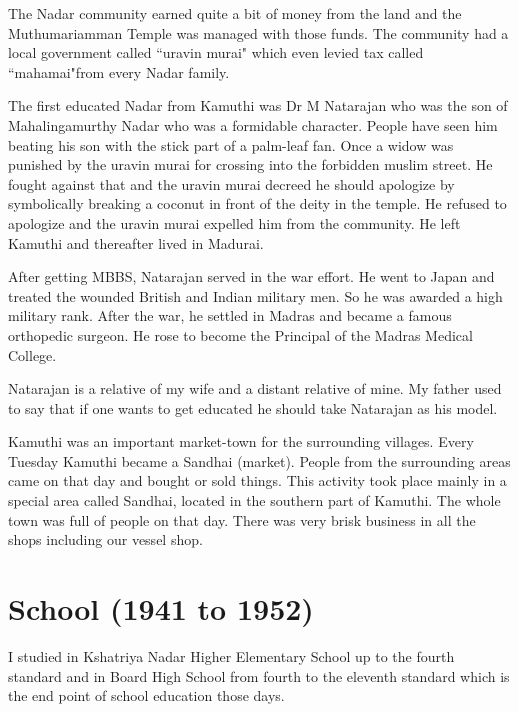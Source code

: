 The Nadar community earned quite a bit of money from the land and the 
Muthumariamman Temple was managed with those funds. The community had a 
local government called ``uravin murai" which even levied tax called 
``mahamai"from every Nadar family.

The first educated Nadar from Kamuthi was Dr M Natarajan who was the son 
of Mahalingamurthy Nadar who was a formidable character. People have 
seen him beating his son with the stick part of a palm-leaf fan. Once a 
widow was punished by the uravin murai for crossing into the forbidden 
muslim street. He fought against that and the uravin murai decreed he 
should apologize by symbolically breaking a coconut in front of the 
deity in the temple. He refused to apologize and the uravin murai 
expelled him from the community. He left Kamuthi and thereafter lived in 
Madurai.

After getting MBBS, Natarajan served in the war effort. He went to Japan 
and treated the wounded British and Indian mili\-tary men. So he was 
awarded a high military rank. After the war, he settled in Madras and 
became a famous orthopedic surgeon. He rose to become the Principal of 
the Madras Medical College.

Natarajan is a relative of my wife and a distant relative of mine. My 
father used to say that if one wants to get educated he should take 
Natarajan as his model.

Kamuthi was an important market-town for the surrounding villages. Every 
Tuesday Kamuthi became a Sandhai (market). People from the surrounding 
areas came on that day and bought or sold things. This activity took 
place mainly in a special area called Sandhai, located in the southern 
part of Kamuthi. The whole town was full of people on that day. There 
was very brisk business in all the shops including our vessel shop.

\section*{School (1941 to 1952)}

I studied in Kshatriya Nadar Higher Elementary School up to the fourth
standard and in Board High School from fourth to the eleventh standard
which is the end point of school education those days.
\medskip

